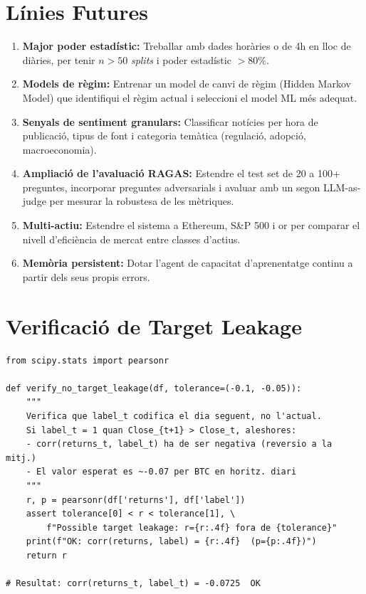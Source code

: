 \documentclass[12pt, a4paper]{report}
\begin{document}
\chapter{Línies Futures}

\begin{enumerate}
  \item \textbf{Major poder estadístic:} Treballar amb dades horàries o de 4h en lloc de diàries, per tenir $n > 50$ \textit{splits} i poder estadístic $> 80\%$.

  \item \textbf{Models de règim:} Entrenar un model de canvi de règim (Hidden Markov Model) que identifiqui el règim actual i seleccioni el model ML més adequat.

  \item \textbf{Senyals de sentiment granulars:} Classificar notícies per hora de publicació, tipus de font i categoria temàtica (regulació, adopció, macroeconomia).

  \item \textbf{Ampliació de l'avaluació RAGAS:} Estendre el test set de 20 a 100+ preguntes, incorporar preguntes adversarials i avaluar amb un segon LLM-as-judge per mesurar la robustesa de les mètriques.

  \item \textbf{Multi-actiu:} Estendre el sistema a Ethereum, S\&P 500 i or per comparar el nivell d'eficiència de mercat entre classes d'actius.

  \item \textbf{Memòria persistent:} Dotar l'agent de capacitat d'aprenentatge continu a partir dels seus propis errors.
\end{enumerate}

\appendix

\chapter{Verificació de Target Leakage}

\begin{lstlisting}[style=python, caption={Test de verificacio de target leakage (statistical\_tests.py)}]
from scipy.stats import pearsonr

def verify_no_target_leakage(df, tolerance=(-0.1, -0.05)):
    """
    Verifica que label_t codifica el dia seguent, no l'actual.
    Si label_t = 1 quan Close_{t+1} > Close_t, aleshores:
    - corr(returns_t, label_t) ha de ser negativa (reversio a la mitj.)
    - El valor esperat es ~-0.07 per BTC en horitz. diari
    """
    r, p = pearsonr(df['returns'], df['label'])
    assert tolerance[0] < r < tolerance[1], \
        f"Possible target leakage: r={r:.4f} fora de {tolerance}"
    print(f"OK: corr(returns, label) = {r:.4f}  (p={p:.4f})")
    return r

# Resultat: corr(returns_t, label_t) = -0.0725  OK
\end{lstlisting}
\end{document}
